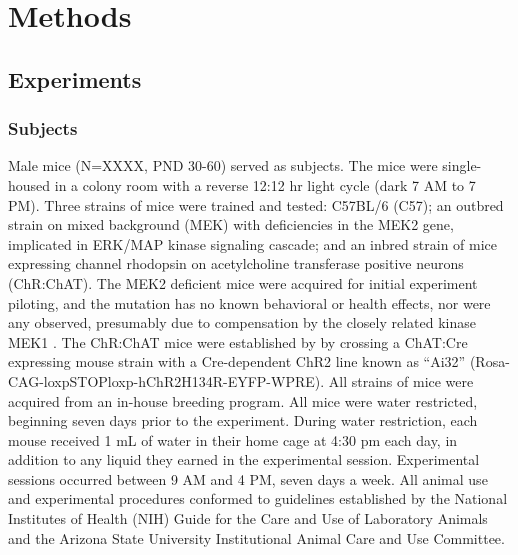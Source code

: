 \section*{Methods}
\label{sec:methods}
\subsection*{Experiments}

\subsubsection*{Subjects}
\label{sec:methods_subjects}
Male mice (N=XXXX, PND 30-60) served as subjects. The mice were single-housed in a colony room with a reverse 12:12 hr light cycle (dark 7 AM to 7 PM). Three strains of mice were trained and tested: C57BL/6 (C57); an outbred strain on mixed background (MEK) with deficiencies in the MEK2 gene, implicated in ERK/MAP kinase signaling cascade; and an inbred strain of mice expressing channel rhodopsin on acetylcholine transferase positive neurons (ChR:ChAT). The MEK2 deficient mice were acquired for initial experiment piloting, and the mutation has no known behavioral or health effects, nor were any observed, presumably due to compensation by the closely related kinase MEK1 \cite{12832465}. The ChR:ChAT mice were established by by crossing a ChAT:Cre expressing mouse strain with a Cre-dependent ChR2 line known as “Ai32” (Rosa-CAG-loxpSTOPloxp-hChR2H134R-EYFP-WPRE). All strains of mice were acquired from an in-house breeding program. All mice were water restricted, beginning seven days prior to the experiment. During water restriction, each mouse received 1 mL of water in their home cage at 4:30 pm each day, in addition to any liquid they earned in the experimental session. Experimental sessions occurred between 9 AM and 4 PM, seven days a week. All animal use and experimental procedures conformed to guidelines established by the National Institutes of Health (NIH) Guide for the Care and Use of Laboratory Animals and the Arizona State University Institutional Animal Care and Use Committee.